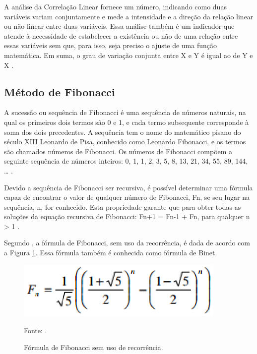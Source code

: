 A análise da Correlação Linear fornece um número, indicando como duas variáveis variam conjuntamente e mede a intensidade e a direção da relação linear ou não-linear entre duas variáveis. Essa análise também é um indicador que atende à necessidade de estabelecer a existência ou não de uma relação entre essas variáveis sem que, para isso, seja preciso o ajuste de uma função matemática. Em suma, o grau de variação conjunta entre X e Y é igual ao de Y e X \cite[pág.~65]{lira2004}.

\subsection{Método de Fibonacci}

A sucessão ou sequência de Fibonacci é uma sequência de números naturais, na qual os primeiros dois termos são 0 e 1, e cada termo subsequente corresponde à soma dos dois precedentes. A sequência tem o nome do matemático pisano do século XIII Leonardo de Pisa,  conhecido como Leonardo Fibonacci, e os termos são chamados números de Fibonacci. Os números de Fibonacci compõem a seguinte sequência de números inteiros: 0, 1, 1, 2, 3, 5, 8, 13, 21, 34, 55, 89, 144, … \cite[pág.~6]{gagliardi2013}.

Devido a sequência de Fibonacci ser recursiva, é possível determinar uma fórmula capaz de encontrar o valor de qualquer número de Fibonacci, Fn, se seu lugar na sequência, n, for conhecido. Esta propriedade garante que para obter todas as soluções da equação recursiva de Fibonacci: Fn+1 = Fn-1 + Fn, para qualquer n > 1 \cite[pág.~12]{sousa2012}.

Segundo , a fórmula de Fibonacci, sem uso da recorrência, é dada de acordo com a Figura \ref{formulaFibonacci}. Essa fórmula também é conhecida como fórmula de Binet.

\begin{figure}[H]
\centering
\includegraphics[width=0.9\textwidth]{figuras/formulaFibonacci}
\caption{Fórmula de Fibonacci sem uso de recorrência.}{Fonte: .} 
\label{formulaFibonacci}
\end{figure}

